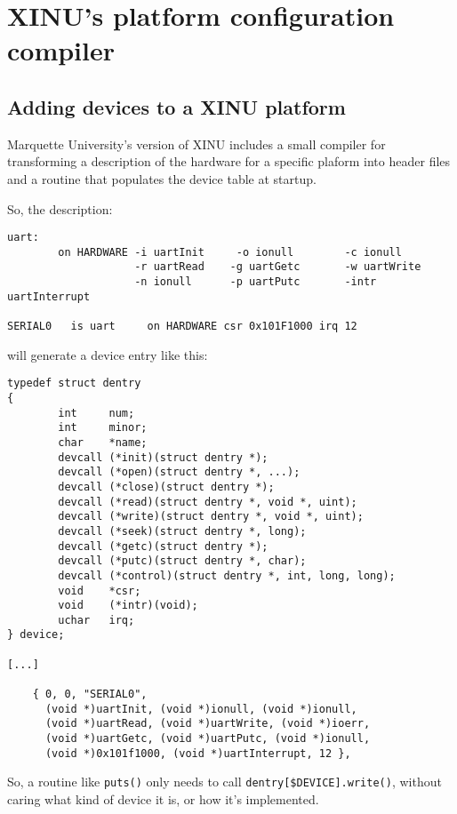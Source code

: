 \documentclass[12pt]{article}
\newcommand{\code}[1]{{\tt #1}}
\begin{document}
\section{XINU's platform configuration compiler}

\subsection{Adding devices to a XINU platform}

Marquette University's version of XINU includes a small compiler for
transforming a description of the hardware for a specific plaform into header
files and a routine that populates the device table at startup.

So, the description:

\begin{verbatim}
uart:
        on HARDWARE -i uartInit     -o ionull        -c ionull
                    -r uartRead    -g uartGetc       -w uartWrite 
                    -n ionull      -p uartPutc       -intr uartInterrupt

SERIAL0   is uart     on HARDWARE csr 0x101F1000 irq 12
\end{verbatim}

will generate a device entry like this:

\begin{verbatim}
typedef struct dentry
{
        int     num;
        int     minor;
        char    *name;
        devcall (*init)(struct dentry *);
        devcall (*open)(struct dentry *, ...);
        devcall (*close)(struct dentry *);
        devcall (*read)(struct dentry *, void *, uint);
        devcall (*write)(struct dentry *, void *, uint);
        devcall (*seek)(struct dentry *, long);
        devcall (*getc)(struct dentry *);
        devcall (*putc)(struct dentry *, char);
        devcall (*control)(struct dentry *, int, long, long);
        void    *csr;
        void    (*intr)(void);
        uchar   irq;
} device;

[...]

	{ 0, 0, "SERIAL0",
	  (void *)uartInit, (void *)ionull, (void *)ionull,
	  (void *)uartRead, (void *)uartWrite, (void *)ioerr,
	  (void *)uartGetc, (void *)uartPutc, (void *)ionull,
	  (void *)0x101f1000, (void *)uartInterrupt, 12 },
\end{verbatim}

So, a routine like \code{puts()} only needs to call
\code{dentry[\$DEVICE].write()}, without caring what kind of device it is, or
how it's implemented.
\end{document}
